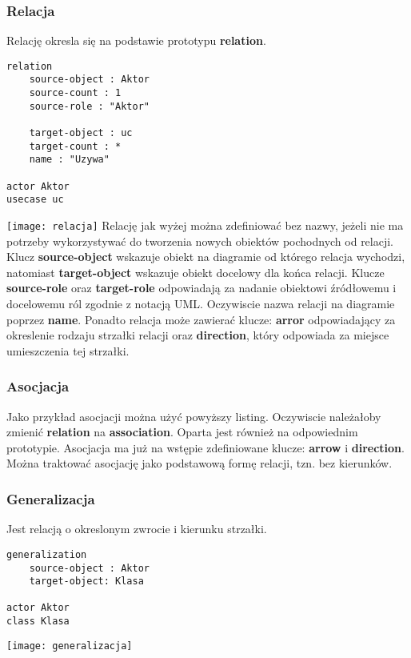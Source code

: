 \subsubsection{Relacja}

Relację okresla się na podstawie prototypu \textbf{relation}.
\begin{lstlisting}
relation
    source-object : Aktor
    source-count : 1
    source-role : "Aktor"

    target-object : uc
    target-count : *
    name : "Uzywa"

actor Aktor
usecase uc
\end{lstlisting}
\texttt{[image: relacja]}
Relację jak wyżej można zdefiniować bez nazwy, jeżeli nie ma potrzeby wykorzystywać do tworzenia nowych obiektów pochodnych od relacji. Klucz \textbf{source-object} wskazuje obiekt na diagramie od którego relacja wychodzi, natomiast \textbf{target-object} wskazuje obiekt docelowy dla końca relacji. Klucze \textbf{source-role} oraz \textbf{target-role} odpowiadają za nadanie obiektowi źródłowemu i docelowemu ról zgodnie z notacją UML. Oczywiscie nazwa relacji na diagramie poprzez \textbf{name}. Ponadto relacja może zawierać klucze: \textbf{arror} odpowiadający za okreslenie rodzaju strzałki relacji oraz \textbf{direction}, który odpowiada za miejsce umieszczenia tej strzałki.

\subsubsection{Asocjacja}

Jako przykład asocjacji można użyć powyższy listing. Oczywiscie należałoby zmienić \textbf{relation} na \textbf{association}. Oparta jest również na odpowiednim prototypie. Asocjacja ma już na wstępie zdefiniowane klucze: \textbf{arrow} i \textbf{direction}. Można traktować asocjację jako podstawową formę relacji, tzn. bez kierunków.

\subsubsection{Generalizacja}

Jest relacją o okreslonym zwrocie i kierunku strzałki.
\begin{lstlisting}
generalization
    source-object : Aktor
    target-object: Klasa

actor Aktor
class Klasa
\end{lstlisting}
\texttt{[image: generalizacja]}

